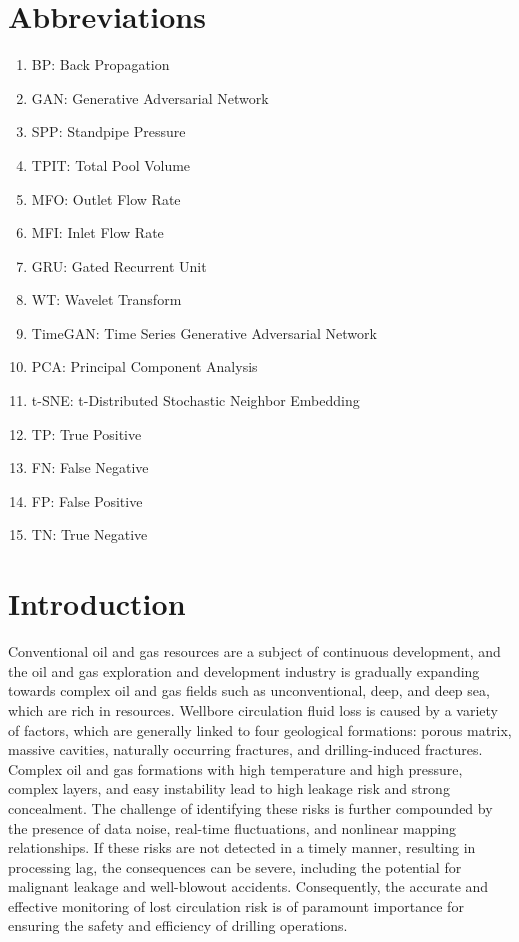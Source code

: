 \documentclass[journal,article,submit,pdftex,moreauthors]{Definitions/mdpi}
\begin{document}
\section*{Abbreviations}
\begin{enumerate}
    \item BP: Back Propagation
    \item GAN: Generative Adversarial Network
    \item SPP: Standpipe Pressure
    \item TPIT: Total Pool Volume
    \item MFO: Outlet Flow Rate
    \item MFI: Inlet Flow Rate
    \item GRU: Gated Recurrent Unit
    \item WT: Wavelet Transform
    \item TimeGAN: Time Series Generative Adversarial Network
    \item PCA: Principal Component Analysis
    \item t-SNE: t-Distributed Stochastic Neighbor Embedding
    \item TP: True Positive
    \item FN: False Negative
    \item FP: False Positive
    \item TN: True Negative
\end{enumerate}
\section{Introduction}

Conventional oil and gas resources are a subject of continuous development, and the oil and gas exploration and development industry is gradually expanding towards complex oil and gas fields such as unconventional, deep, and deep sea, which are rich in resources. Wellbore circulation fluid loss is caused by a variety of factors, which are generally linked to four geological formations\cite{ELMOUSALAMI2024212837}: porous matrix, massive cavities, naturally occurring fractures, and drilling-induced fractures\cite{ALBATTAT2022110770}. Complex oil and gas formations with high temperature and high pressure, complex layers, and easy instability lead to high leakage risk and strong concealment. The challenge of identifying these risks is further compounded by the presence of data noise, real-time fluctuations, and nonlinear mapping relationships\cite{LIU2022162}. If these risks are not detected in a timely manner, resulting in processing lag, the consequences can be severe, including the potential for malignant leakage and well-blowout accidents. Consequently, the accurate and effective monitoring of lost circulation risk is of paramount importance for ensuring the safety and efficiency of drilling operations.
\end{document}
